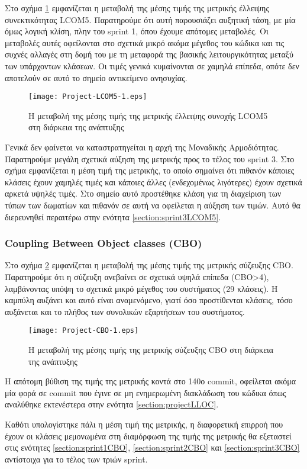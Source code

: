 Στο σχήμα \ref{fig:projectLCOM5} εμφανίζεται η μεταβολή της μέσης τιμής
της μετρικής έλλειψης συνεκτικότητας LCOM5. Παρατηρούμε ότι αυτή
παρουσιάζει αυξητική τάση, με μία όμως λογική κλίση, πλην
του sprint 1, όπου έχουμε απότομες μεταβολές. Οι μεταβολές αυτές
οφείλονται στο σχετικά μικρό ακόμα μέγεθος του κώδικα και τις συχνές
αλλαγές στη δομή του με τη μεταφορά της βασικής λειτουργικότητας μεταξύ
των υπάρχοντων κλάσεων. Οι τιμές γενικά κυμαίνονται
σε χαμηλά επίπεδα, οπότε δεν αποτελούν σε αυτό το σημείο αντικείμενο
ανησυχίας.

\begin{figure}
\centering
\texttt{[image: Project-LCOM5-1.eps]}
\caption{Η μεταβολή της μέσης τιμής της μετρικής έλλειψης συνοχής
LCOM5 στη διάρκεια της ανάπτυξης}
\label{fig:projectLCOM5}
\end{figure}

Γενικά δεν φαίνεται να καταστρατηγείται η αρχή της Μοναδικής
Αρμοδιότητας. Παρατηρούμε μεγάλη σχετικά αύξηση της μετρικής προς το τέλος του
sprint 3.
Στο σχήμα εμφανίζεται η μέση τιμή της μετρικής, το
οποίο σημαίνει ότι πιθανόν κάποιες κλάσεις έχουν χαμηλές τιμές και
κάποιες άλλες (ενδεχομένως λιγότερες) έχουν σχετικά αρκετά υψηλές τιμές.
Στο σημείο αυτό προστέθηκε κλάση για τη διαχείριση των
τύπων των δωματίων και πιθανόν σε αυτή να οφείλεται η αύξηση των τιμών.
Αυτό θα διερευνηθεί περαιτέρω στην ενότητα
\ref{section:sprint3LCOM5}.

\subsubsection{Coupling Between Object classes (CBO)}

Στο σχήμα \ref{fig:projectCBO} εμφανίζεται η μεταβολή της μέσης τιμής της
μετρικής σύζευξης CBO. Παρατηρούμε ότι η σύζευξη ανεβαίνει σε σχετικά υψηλά επίπεδα
(CBO>4), λαμβάνοντας υπόψη το σχετικά μικρό μέγεθος του συστήματος
(29 κλάσεις). Η καμπύλη αυξάνει και αυτό είναι αναμενόμενο, γιατί όσο
προστίθενται κλάσεις, τόσο αυξάνεται και το πλήθος των συνολικών
εξαρτήσεων του συστήματος.

\begin{figure}
\centering
\texttt{[image: Project-CBO-1.eps]}
\caption{Η μεταβολή της μέσης τιμής της μετρικής σύζευξης
CBO στη διάρκεια της ανάπτυξης}
\label{fig:projectCBO}
\end{figure}

Η απότομη βύθιση της τιμής της μετρικής κοντά στο 140ο commit, οφείλεται
ακόμα μία φορά σε commit που έγινε σε μη ενημερωμένη διακλάδωση του
κώδικα όπως αναλύθηκε εκτενέστερα στην ενότητα \ref{section:projectLLOC}.

Καθότι υπολογίστηκε πάλι η μέση τιμή της μετρικής, η διαφορετική επιρροή
που έχουν οι κλάσεις μεμονωμένα στη διαμόρφωση της τιμής της μετρικής θα
εξεταστεί στις ενότητες \ref{section:sprint1CBO},
\ref{section:sprint2CBO} και \ref{section:sprint3CBO} αντίστοιχα για το
τέλος των τριών sprint.

